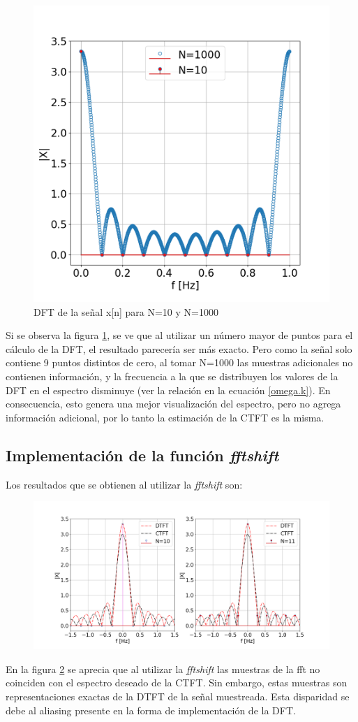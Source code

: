 \documentclass[11pt,a4paper]{article}
\begin{document}
 \begin{figure}
 \centering
     \includegraphics[width=.6\textwidth]{Img/punto_4_e.png}
     \caption{DFT de la señal x[n] para N=10 y N=1000}
     \label{fig.4e}
 \end{figure}
 Si se observa la figura \ref{fig.4e}, se ve que al utilizar un número mayor de puntos para el cálculo de la DFT, el resultado parecería ser más exacto. Pero como la señal solo contiene 9 puntos distintos de cero, al tomar N=1000 las muestras adicionales no contienen información, y la frecuencia a la que se distribuyen los valores de la DFT en el espectro disminuye (ver la relación en la ecuación \ref{omega.k}). En consecuencia, esto genera una mejor visualización del espectro, pero no agrega información adicional, por lo tanto la estimación de la CTFT es la misma.



\subsection{Implementación de la función \textit{fftshift}}
Los resultados que se obtienen al utilizar la \textit{fftshift} son:
\begin{figure}[H]
    \centering
    \includegraphics[width=\textwidth]{Img/punto_4_f.png}
    \caption{}
    \label{fftshift}
\end{figure}
En la figura \ref{fftshift} se aprecia que al utilizar la \textit{fftshift} las muestras de la fft no coinciden con el espectro deseado de la CTFT. Sin embargo, estas muestras son representaciones exactas de la DTFT de la señal muestreada. Esta disparidad se debe al aliasing presente en la forma de implementación de la DFT.
\end{document}
